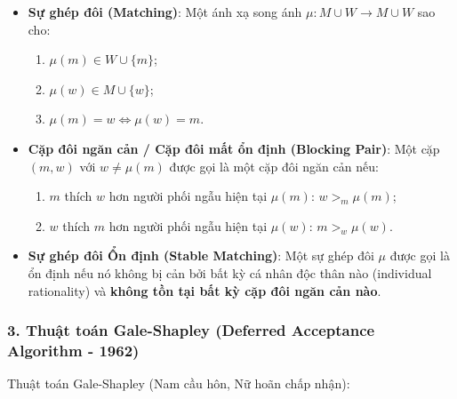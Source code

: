 \documentclass[
]{article}
\providecommand{\tightlist}{%
  \setlength{\itemsep}{0pt}\setlength{\parskip}{0pt}}
\begin{document}
\begin{itemize}
\tightlist
\item
  \textbf{Sự ghép đôi (Matching)}: Một ánh xạ song ánh
  \(\mu: M \cup W \to M \cup W\) sao cho:

  \begin{enumerate}
  \def\labelenumi{\arabic{enumi}.}
  \tightlist
  \item
    \(\mu(m) \in W \cup \{m\}\);
  \item
    \(\mu(w) \in M \cup \{w\}\);
  \item
    \(\mu(m) = w \iff \mu(w) = m\).
  \end{enumerate}
\item
  \textbf{Cặp đôi ngăn cản / Cặp đôi mất ổn định (Blocking Pair)}: Một
  cặp \((m, w)\) với \(w \neq \mu(m)\) được gọi là một cặp đôi ngăn cản
  nếu:

  \begin{enumerate}
  \def\labelenumi{\arabic{enumi}.}
  \tightlist
  \item
    \(m\) thích \(w\) hơn người phối ngẫu hiện tại \(\mu(m)\):
    \(w >_m \mu(m)\);
  \item
    \(w\) thích \(m\) hơn người phối ngẫu hiện tại \(\mu(w)\):
    \(m >_w \mu(w)\).
  \end{enumerate}
\item
  \textbf{Sự ghép đôi Ổn định (Stable Matching)}: Một sự ghép đôi
  \(\mu\) được gọi là ổn định nếu nó không bị cản bởi bất kỳ cá nhân độc
  thân nào (individual rationality) và \textbf{không tồn tại bất kỳ cặp
  đôi ngăn cản nào}.
\end{itemize}

\subsubsection{3. Thuật toán Gale-Shapley (Deferred Acceptance Algorithm
-
1962)}\label{thuux1eadt-touxe1n-gale-shapley-deferred-acceptance-algorithm---1962}

Thuật toán Gale-Shapley (Nam cầu hôn, Nữ hoãn chấp nhận):
\end{document}
